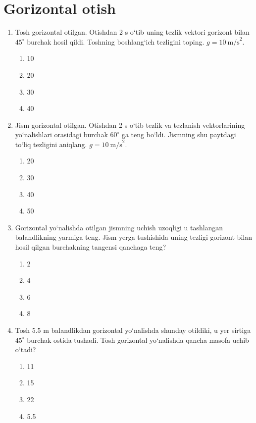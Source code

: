 
\section{Gorizontal otish}

\begin{enumerate}

\item Tosh gorizontal otilgan. Otishdan 2 s o‘tib uning tezlik vektori gorizont bilan $45^\circ$ burchak hosil qildi. Toshning boshlang‘ich tezligini toping. $g=10\ \text{m/s}^2$.

\begin{enumerate}[label=\Alph*)]
\item 10
\item 20
\item 30
\item 40
\end{enumerate}

\item Jism gorizontal otilgan. Otishdan 2 s o‘tib tezlik va tezlanish vektorlarining yo‘nalishlari orasidagi burchak $60^\circ$ ga teng bo‘ldi. Jismning shu paytdagi to‘liq tezligini aniqlang. $g=10\ \text{m/s}^2$.

\begin{enumerate}[label=\Alph*)]
\item 20
\item 30
\item 40
\item 50
\end{enumerate}

\item Gorizontal yo‘nalishda otilgan jismning uchish uzoqligi u tashlangan balandlikning yarmiga teng. Jism yerga tushishida uning tezligi gorizont bilan hosil qilgan burchakning tangensi qanchaga teng?

\begin{enumerate}[label=\Alph*)]
\item 2
\item 4
\item 6
\item 8
\end{enumerate}

\item Tosh 5.5 m balandlikdan gorizontal yo‘nalishda shunday otildiki, u yer sirtiga $45^\circ$ burchak ostida tushadi. Tosh gorizontal yo‘nalishda qancha masofa uchib o‘tadi?

\begin{enumerate}[label=\Alph*)]
\item 11
\item 15
\item 22
\item 5.5
\end{enumerate}


\end{enumerate}
